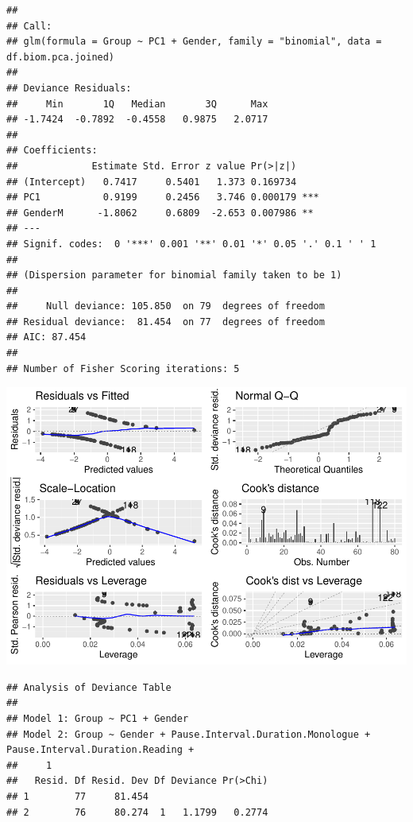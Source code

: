 \documentclass[
  english,
  doc,floatsintext]{apa6}
\begin{document}
\begin{verbatim}
## 
## Call:
## glm(formula = Group ~ PC1 + Gender, family = "binomial", data = df.biom.pca.joined)
## 
## Deviance Residuals: 
##     Min       1Q   Median       3Q      Max  
## -1.7424  -0.7892  -0.4558   0.9875   2.0717  
## 
## Coefficients:
##             Estimate Std. Error z value Pr(>|z|)    
## (Intercept)   0.7417     0.5401   1.373 0.169734    
## PC1           0.9199     0.2456   3.746 0.000179 ***
## GenderM      -1.8062     0.6809  -2.653 0.007986 ** 
## ---
## Signif. codes:  0 '***' 0.001 '**' 0.01 '*' 0.05 '.' 0.1 ' ' 1
## 
## (Dispersion parameter for binomial family taken to be 1)
## 
##     Null deviance: 105.850  on 79  degrees of freedom
## Residual deviance:  81.454  on 77  degrees of freedom
## AIC: 87.454
## 
## Number of Fisher Scoring iterations: 5
\end{verbatim}

\includegraphics{dap_report_anja_probst_files/figure-latex/compare PCA-based model to best model from eval-1.pdf}

\begin{verbatim}
## Analysis of Deviance Table
## 
## Model 1: Group ~ PC1 + Gender
## Model 2: Group ~ Gender + Pause.Interval.Duration.Monologue + Pause.Interval.Duration.Reading + 
##     1
##   Resid. Df Resid. Dev Df Deviance Pr(>Chi)
## 1        77     81.454                     
## 2        76     80.274  1   1.1799   0.2774
\end{verbatim}
\end{document}
